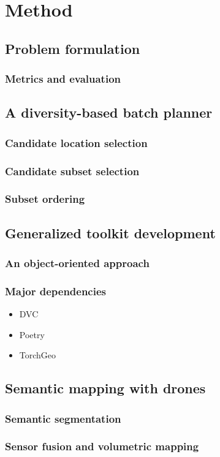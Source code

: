 \chapter{Method} \label{chapMethod}

\section{Problem formulation}
\subsection{Metrics and evaluation}
\section{A diversity-based batch planner}
\subsection{Candidate location selection}
\subsection{Candidate subset selection}
\subsection{Subset ordering}

\section{Generalized toolkit development}
\subsection{An object-oriented approach}
\subsection{Major dependencies}
\begin{itemize}
    \item DVC
    \item Poetry
    \item TorchGeo 
\end{itemize}

\section{Semantic mapping with drones}
\subsection{Semantic segmentation}
\subsection{Sensor fusion and volumetric mapping}